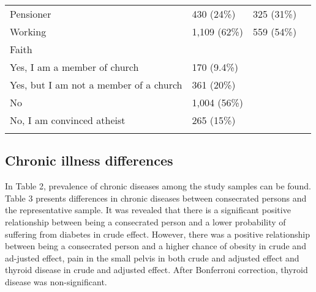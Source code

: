 \documentclass[ijerph,article,accept,moreauthors,pdftex]{mdpi}
\begin{document}
\begin{table}
{\begin{tabular}[t]{llll}
\hspace{1em}Pensioner & 430 (24\%) & 325 (31\%) & \\
\hspace{1em}Working & 1,109 (62\%) & 559 (54\%) & \\
Faith &  &  & \\
\hspace{1em}Yes, I am a member of church & 170 (9.4\%) &  & \\
\addlinespace
\hspace{1em}Yes, but I am not a member of a church & 361 (20\%) &  & \\
\hspace{1em}No & 1,004 (56\%) &  & \\
\hspace{1em}No, I am convinced atheist & 265 (15\%) &  & \\
\bottomrule{}
\end{tabular}}
\end{table}

\newpage

\hypertarget{chronic-illness-differences}{%
\subsection{Chronic illness
differences}\label{chronic-illness-differences}}

In Table 2, prevalence of chronic diseases among the study samples can
be found. Table 3 presents differences in chronic diseases between
consecrated persons and the representative sample. It was revealed that
there is a significant positive relationship between being a consecrated
person and a lower probability of suffering from diabetes in crude
effect. However, there was a positive relationship between being a
consecrated person and a higher chance of obesity in crude and ad-justed
effect, pain in the small pelvis in both crude and adjusted effect and
thyroid disease in crude and adjusted effect. After Bonferroni
correction, thyroid disease was non-significant.
\end{document}
